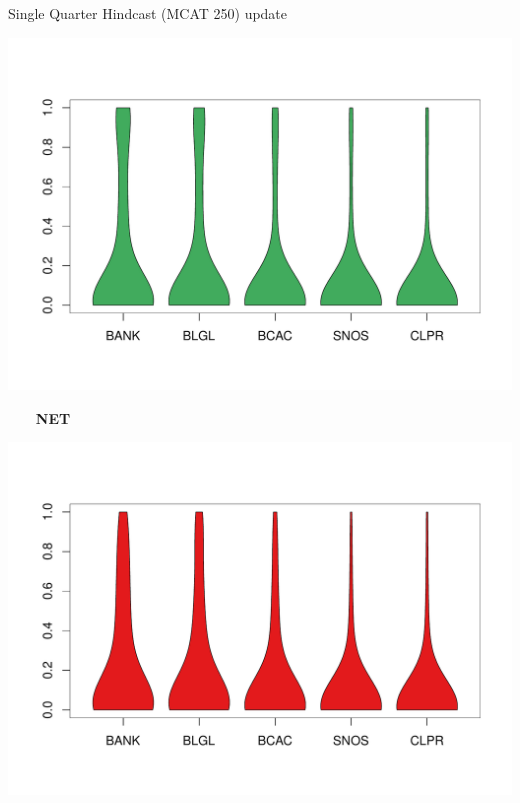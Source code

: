 \documentclass[ xcolor = pdftex, dvipsnames, table ]{beamer}
\begin{document}
\begin{frame}{Single Quarter Hindcast (MCAT 250) {\color{red} update}}
\begin{minipage}{0.29\textwidth}
\vspace*{-1.3cm}
\includegraphics[height=0.36\textheight]{../pictures/vioStarOSDHKL.pdf}
\end{minipage}
\hspace*{0.5cm}
\begin{minipage}{0.29\textwidth}
\begin{center}
$~~~~~~~~~$\textbf{NET}
\end{center}
\vspace*{-0.75cm}
\includegraphics[height=0.36\textheight]{../pictures/vioStarOSBNET.pdf}\\
\vspace*{-1.3cm}

\end{minipage}
\end{frame}
\end{document}
